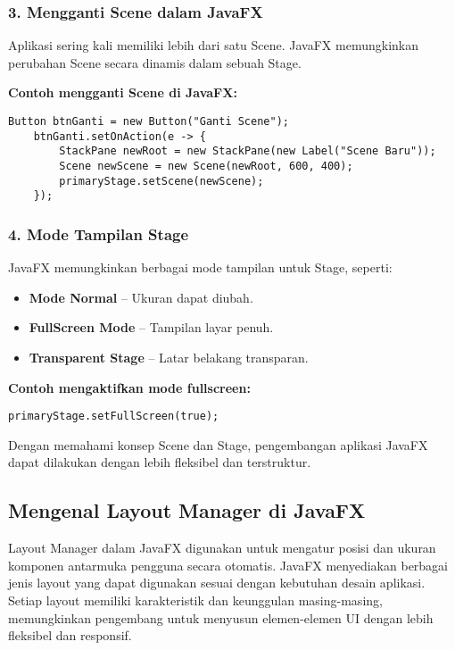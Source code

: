\subsubsection{3. Mengganti Scene dalam JavaFX}
Aplikasi sering kali memiliki lebih dari satu Scene. JavaFX memungkinkan perubahan Scene secara dinamis dalam sebuah Stage.

\textbf{Contoh mengganti Scene di JavaFX:}
\begin{lstlisting}[style=JavaStyle, caption=Mengubah Scene dalam JavaFX]
	Button btnGanti = new Button("Ganti Scene");
	btnGanti.setOnAction(e -> {
		StackPane newRoot = new StackPane(new Label("Scene Baru"));
		Scene newScene = new Scene(newRoot, 600, 400);
		primaryStage.setScene(newScene);
	});
\end{lstlisting}

\subsubsection{4. Mode Tampilan Stage}
JavaFX memungkinkan berbagai mode tampilan untuk Stage, seperti:
\begin{itemize}
	\item \textbf{Mode Normal} – Ukuran dapat diubah.
	\item \textbf{FullScreen Mode} – Tampilan layar penuh.
	\item \textbf{Transparent Stage} – Latar belakang transparan.
\end{itemize}

\textbf{Contoh mengaktifkan mode fullscreen:}
\begin{lstlisting}[style=JavaStyle, caption=Mengaktifkan mode layar penuh dalam JavaFX]
	primaryStage.setFullScreen(true);
\end{lstlisting}

Dengan memahami konsep Scene dan Stage, pengembangan aplikasi JavaFX dapat dilakukan dengan lebih fleksibel dan terstruktur.

\subsection{Mengenal Layout Manager di JavaFX}

Layout Manager dalam JavaFX digunakan untuk mengatur posisi dan ukuran komponen antarmuka pengguna secara otomatis. JavaFX menyediakan berbagai jenis layout yang dapat digunakan sesuai dengan kebutuhan desain aplikasi. Setiap layout memiliki karakteristik dan keunggulan masing-masing, memungkinkan pengembang untuk menyusun elemen-elemen UI dengan lebih fleksibel dan responsif.

